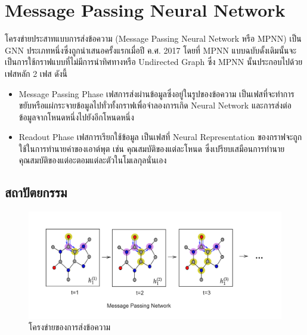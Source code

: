 \section{Message Passing Neural Network}
\label{sec:mpnn}

โครงข่ายประสาทแบบการส่งข้อความ (Message Passing Neural Network หรือ MPNN) เป็น GNN ประเภทหนึ่งซึ่งถูกนำเสนอครั้งแรกเมื่อปี ค.ศ. 2017\autocite{gilmer2017} โดยที่ MPNN แบบฉบับดั้งเดิมนั้นจะเป็นการใช้กราฟแบบที่ไม่มีการนำทิศทางหรือ Undirected Graph ซึ่ง MPNN นั้นประกอบไปด้วยเฟสหลัก 2 เฟส ดังนี้
%
\begin{itemize}[topsep=0pt,noitemsep]\setlength\itemsep{0.5em}
    \item Message Passing Phase เฟสการส่งผ่านข้อมูลซึ่งอยู่ในรูปของข้อความ เป็นเฟสที่จะทำการขยับหรือแผ่กระจายข้อมูลไปทั่วทั้งกราฟเพื่อจำลองการเกิด Neural Network และการส่งต่อข้อมูลจากโหนดหนึ่งไปยังอีกโหนดหนึ่ง

    \item Readout Phase เฟสการเรียกใช้ข้อมูล เป็นเฟสที่ Neural Representation ของกราฟจะถูกใช้ในการทำนายค่าของเอาต์พุต เช่น คุณสมบัติของแต่ละโหนด ซึ่งเปรียบเสมือนการทำนายคุณสมบัติของแต่อะตอมแต่ละตัวในโมเลกุลนั่นเอง
\end{itemize}

\subsection{สถาปัตยกรรม}
\label{ssec:mpnn_architect}

\begin{figure}[H]
    \centering
    \includegraphics[width=\linewidth]{fig/mp-network.png}
    \caption{โครงข่ายของการส่งข้อความ}
    \label{fig:mp_network}
\end{figure}

